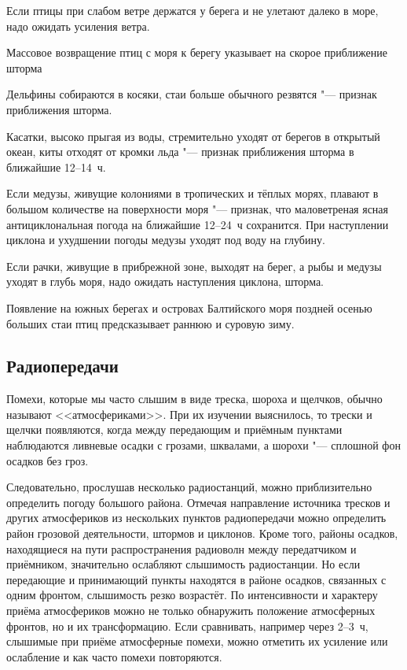  Если птицы при слабом ветре держатся у берега и не улетают далеко
в море, надо ожидать усиления ветра.

 Массовое возвращение птиц с моря к берегу указывает на скорое
приближение шторма

 Дельфины собираются в косяки, стаи больше обычного резвятся
"--- признак приближения шторма.

 Касатки, высоко прыгая из воды, стремительно уходят от берегов
в открытый океан, киты отходят от кромки льда "--- признак приближения
шторма в ближайшие 12--14~ч.

 Если медузы, живущие колониями в тропических и тёплых морях,
плавают в большом количестве на поверхности моря "--- признак, что
маловетреная ясная антициклональная погода на ближайшие 12--24~ч
сохранится. При наступлении циклона и ухудшении погоды медузы уходят
под воду на глубину.

 Если рачки, живущие в прибрежной зоне, выходят на берег, а рыбы и
медузы уходят в глубь моря, надо ожидать наступления циклона, шторма.

 Появление на южных берегах и островах Балтийского моря поздней
осенью больших стаи птиц предсказывает раннюю и суровую зиму.

\subsection{Радиопередачи}

Помехи, которые мы часто слышим в виде треска, шороха и щелчков,
обычно называют <<атмосфериками>>. При их изучении выяснилось, то трески
и щелчки появляются, когда между передающим и приёмным пунктами
наблюдаются ливневые осадки с грозами, шквалами, а шорохи "---
сплошной фон осадков без гроз.

Следовательно, прослушав несколько радиостанций, можно приблизительно
определить погоду большого района. Отмечая направление источника
тресков и других атмосфериков из нескольких пунктов радиопередачи
можно определить район грозовой деятельности, штормов и
циклонов. Кроме того, районы осадков, находящиеся на пути
распространения радиоволн между передатчиком и приёмником, значительно
ослабляют слышимость радиостанции. Но если передающие и принимающий
пункты находятся в районе осадков, связанных с одним фронтом,
слышимость резко возрастёт. По интенсивности и характеру приёма
атмосфериков можно не только обнаружить положение атмосферных фронтов,
но и их трансформацию. Если сравнивать, например через 2--3~ч,
слышимые при приёме атмосферные помехи, можно отметить их усиление или
ослабление и как часто помехи повторяются.

